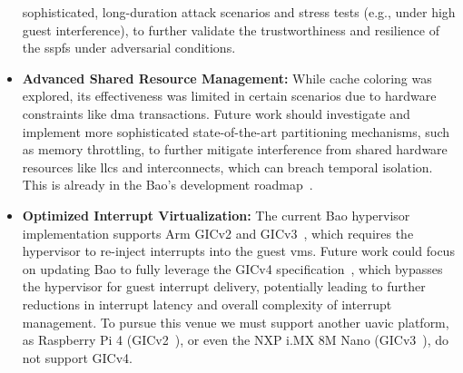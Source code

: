 \begin{itemize}
sophisticated, long-duration attack scenarios and stress tests (e.g., under high
guest interference), to further validate the trustworthiness and resilience of
the \gls{sspfs} under adversarial conditions.
\item \textbf{Advanced Shared Resource Management:}
  While cache coloring was explored, its effectiveness was limited in certain
  scenarios due to hardware constraints like \gls{dma} 
  transactions. Future work should investigate and implement more sophisticated
  state-of-the-art partitioning mechanisms, such as memory throttling, to
  further mitigate interference from shared hardware resources like \glspl{llc}
  and interconnects, which can breach temporal isolation. This is already in the
  Bao's development roadmap~\cite{martins_et_al:OASIcs:2020:11779}.
\item \textbf{Optimized Interrupt Virtualization:} The current Bao hypervisor
  implementation supports Arm GICv2 and GICv3~\cite{baoRepo}, which requires the hypervisor
  to re-inject interrupts into the guest \glspl{vm}. Future work could focus on
  updating Bao to fully leverage the GICv4 specification~\cite{arm-gicv4}, which bypasses the
  hypervisor for guest interrupt delivery, potentially leading to further
  reductions in interrupt latency and overall complexity of interrupt
  management. To pursue this venue we must support another \gls{uavic} platform,
  as Raspberry Pi 4 (GICv2~\cite{rpi4-datasheet,arm-gic400}), or even the NXP
  i.MX 8M Nano (GICv3~\cite{imx8mn-rm}), do not support GICv4.
\end{itemize}


